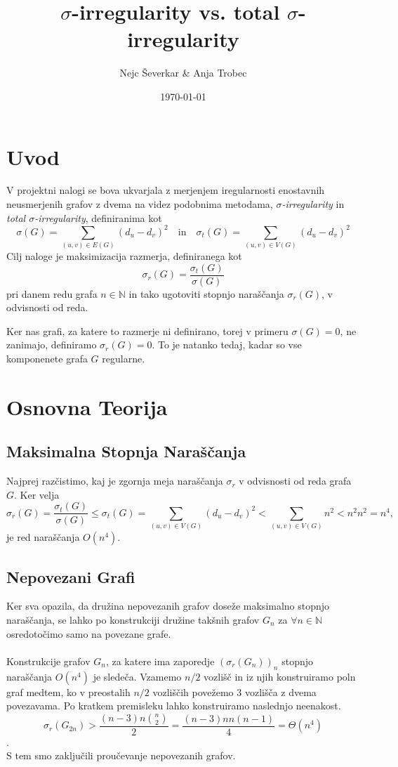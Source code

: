 \documentclass[ letterpaper, titlepage, fleqn]{article}
\begin{document}
\title{$\sigma$-irregularity vs. total $\sigma$-irregularity}
\author{Nejc Ševerkar \& Anja Trobec}
\date{\today}
\maketitle

\section{Uvod}
V projektni nalogi se bova ukvarjala z merjenjem iregularnosti enostavnih neusmerjenih grafov z
dvema na videz podobnima metodama, {\em $\sigma$-irregularity} in {\em total $\sigma$-irregularity},
definiranima kot 
$$
\sigma(G) = \sum_{(u, v) \in E(G)}(d_u - d_v)^2 
\quad \text{in} \quad
\sigma_t(G) = \sum_{(u, v) \in V(G)}(d_u - d_v)^2
$$
Cilj naloge je maksimizacija razmerja, definiranega kot 
$$\sigma_r(G) = \frac{\sigma_t(G)}{\sigma(G)}$$
pri danem redu grafa $n \in \mathbb{N}$ in tako ugotoviti 
stopnjo naraščanja $\sigma_r(G)$, v odvisnosti od reda.

Ker nas grafi, za katere to razmerje ni definirano,
torej v primeru $\sigma(G) = 0$, ne zanimajo, definiramo $\sigma_r(G) = 0$.
To je natanko tedaj, kadar so vse komponenete grafa $G$ regularne.

\section{Osnovna Teorija}

\subsection{Maksimalna Stopnja Naraščanja}
Najprej razčistimo, kaj je zgornja meja naraščanja $\sigma_r$ v odvisnosti
od reda grafa $G$. Ker velja
$$
\sigma_r(G) = \frac{\sigma_t(G)}{\sigma(G)} 
\leq \sigma_t(G)
= \sum_{(u, v) \in V(G)}(d_u - d_v)^2 
< \sum_{(u, v) \in V(G)}n^2
< n^2  n^2 = n^4,
$$
je red naraščanja $O(n^4)$.

\subsection{Nepovezani Grafi}
Ker sva opazila, da družina nepovezanih grafov doseže maksimalno stopnjo naraščanja,
se lahko po konstrukciji družine takšnih grafov $G_n$ za $\forall n \in \mathbb{N}$
osredotočimo samo na povezane grafe.
\\\\
Konstrukcije grafov $G_n$, za katere ima zaporedje $(\sigma_r(G_n))_n$ stopnjo 
naraščanja $O(n^4)$ je sledeča.
Vzamemo $n / 2$ vozlišč in iz njih konstruiramo poln graf
medtem, ko v preostalih $n /2$ vozliščih povežemo 3 vozlišča z dvema povezavama.
Po kratkem premisleku lahko konstruiramo naslednjo neenakost.
$$\sigma_r(G_{2n}) > \frac{(n - 3)n \binom{n}{2}}{2} = \frac{(n - 3)n n(n - 1)}{4} = \Theta(n^4)$$.
\\
S tem smo zaključili proučevanje nepovezanih grafov.
\end{document}

